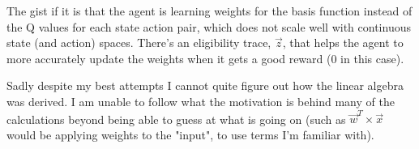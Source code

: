 \documentclass{article}
\begin{document}
The gist if it is that the agent is learning weights for the basis function instead of the Q values for each 
state action pair, which does not scale well with continuous state (and action)
spaces. There's an eligibility trace, $ \vec{z} $, that helps the agent to more
accurately update the weights when it gets a good reward (0 in this case). 

Sadly despite my best attempts I cannot quite figure out how the linear algebra
was derived. I am unable to follow what the motivation is behind many of the calculations beyond being
able to guess at what is going on (such as $ \vec{w}^T \times \vec{x} $ would
be applying weights to the "input", to use terms I'm familiar with). 
    
\end{document}
